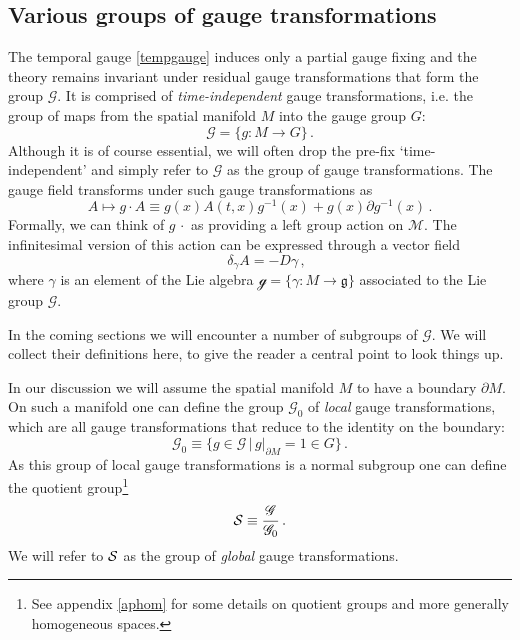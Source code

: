 \documentclass[11pt,a4paper]{article}
\def\calg{{\mathscr G}}
\def\calsg{{\boldsymbol{\mathscr g}}}
\def\calm{{\mathcal{M}}}
\def\cals{{\cal S}}
\def\grad{{\partial}}
\begin{document}
    \subsection{Various groups of gauge transformations}
    The temporal gauge \eqref{tempgauge} induces only a partial gauge fixing and the theory remains invariant under residual gauge transformations that form the group $\calg$. It is comprised of {\it time-independent} gauge transformations, i.e. the group of maps from the spatial manifold $M$ into the gauge group $G$:
    \begin{equation}
    \calg=\{g: M\rightarrow G\}\,.
    \end{equation}
    Although it is of course essential, we will often drop the pre-fix `time-independent' and simply refer to $\calg$ as the group of gauge transformations. The gauge field transforms under such gauge transformations as
    \begin{equation}
    A\mapsto g\cdot A\equiv g(x)A(t,x)g^{-1}(x)+g(x)\grad g^{-1}(x)\label{leftact}\,.
    \end{equation}
    Formally, we can think of $g\,\cdot$ as providing a left group action on $\calm$.
    The infinitesimal version of this action can be expressed through a vector field
    \begin{equation}
    \quad\delta_\gamma A=-D\gamma\,,\label{gaugetransfo}
    \end{equation}
    where $\gamma$ is an element of the Lie algebra $\calsg=\{\gamma: M \to \mathfrak{g}\}$ associated to the Lie group $\calg$.
    
    In the coming sections we will encounter a number of subgroups of $\calg$. We will collect their definitions here, to give the reader a central point to look things up.
    
    In our discussion we will assume the spatial manifold $M$ to have a boundary $\partial M$. On such a manifold one can define the group $\calg_0$ of {\it local} gauge transformations, which are all gauge transformations that reduce to the identity on the boundary:
    \begin{equation}
\calg_0\equiv\{g\in \calg\,|\, \left.g\right|_{\partial M}=1\in G\} \,.   \label{Local symmetry group}
    \end{equation}
    As this group of local gauge transformations is a normal subgroup one can define the quotient group\footnote{See appendix \ref{aphom} for some details on quotient groups and more generally homogeneous spaces.}
    \begin{equation}
    \cals\equiv\frac{\calg}{\calg_0}\,.
    \end{equation}
    We will refer to $\cals$ as the group of {\it global } gauge transformations. 
    
\end{document}
